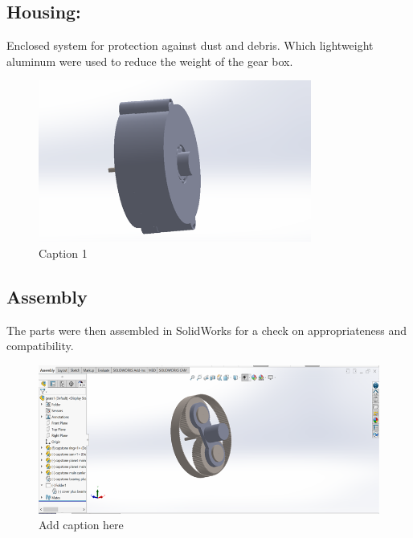 \documentclass[../../main]{subfiles}
\begin{document}
\subsection{Housing:} 
Enclosed system for protection against dust and debris.
Which lightweight aluminum were used to reduce the weight of the gear
box.
\begin{figure}[h]
  \centering
  \includegraphics[width=0.8\textwidth]{sublatex/Opryrmi/media/image5.png} 
  \caption{Caption 1}
\end{figure}

\newpage
\subsection{Assembly}

The parts were then assembled in SolidWorks for a check on
appropriateness and compatibility.
\begin{figure}[h]
  \centering
\includegraphics[]{sublatex/Opryrmi/media/image6.png}
\caption{Add caption here}
\end{figure}
\end{document}
